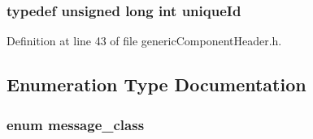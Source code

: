 \subsubsection[{uniqueId}]{\setlength{\rightskip}{0pt plus 5cm}typedef unsigned long int {\bf uniqueId}}\label{genericComponentHeader_8h_880960a57c549f69d77cf01237366978}




Definition at line 43 of file genericComponentHeader.h.

\subsection{Enumeration Type Documentation}
\subsubsection[{message\_\-class}]{\setlength{\rightskip}{0pt plus 5cm}enum {\bf message\_\-class}}\label{genericComponentHeader_8h_155eefa40b3e6db305cb151f7bb6bef4}


